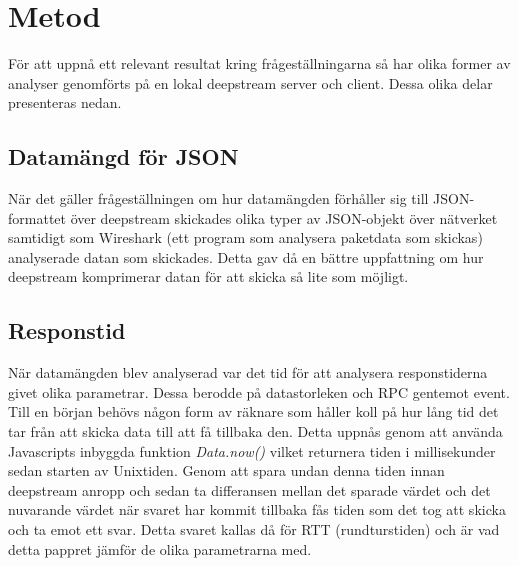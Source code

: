 \section{Metod}
\label{sec:tim-method}
För att uppnå ett relevant resultat kring frågeställningarna så har olika former av analyser genomförts på en lokal deepstream server och client. Dessa olika delar presenteras nedan.

\subsection{Datamängd för JSON}
När det gäller frågeställningen om hur datamängden förhåller sig till JSON-formattet över deepstream skickades olika typer av JSON-objekt över nätverket samtidigt som Wireshark (ett program som analysera paketdata som skickas) analyserade datan som skickades. Detta gav då en bättre uppfattning om hur deepstream komprimerar datan för att skicka så lite som möjligt.

\subsection{Responstid}
När datamängden blev analyserad var det tid för att analysera responstiderna givet olika parametrar. Dessa berodde på datastorleken och RPC gentemot event. Till en början behövs någon form av räknare som håller koll på hur lång tid det tar från att skicka data till att få tillbaka den. Detta uppnås genom att använda Javascripts inbyggda funktion \textit{Data.now()} vilket returnera tiden i millisekunder sedan starten av Unixtiden\cite{js-datenow}. Genom att spara undan denna tiden innan deepstream anropp och sedan ta differansen mellan det sparade värdet och det nuvarande värdet när svaret har kommit tillbaka fås tiden som det tog att skicka och ta emot ett svar. Detta svaret kallas då för RTT (rundturstiden) och är vad detta pappret jämför de olika parametrarna med. 

